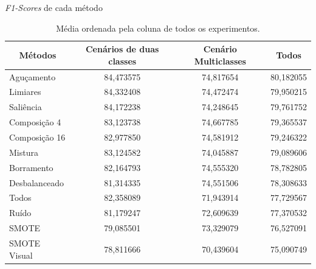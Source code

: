 \documentclass{beamer}
\begin{document}
\begin{frame}{\textit{F1-Scores} de cada método}
  \setlength\leftmargini{1em}
  \begin{table}
    \centering
    \caption{Média ordenada pela coluna de todos os experimentos.}
    \tiny{
    \begin{tabular}{|l|c|c|c|}
      \hline
      \multicolumn{1}{|c|}{\textbf{Métodos}} & \textbf{Cenários de duas classes} & \textbf{Cenário Multiclasses} & \textbf{Todos} \\ \hline
      Aguçamento                             & 84,473575                         & 74,817654                     & 80,182055      \\ \hline
      Limiares                               & 84,332408                         & 74,472474                     & 79,950215      \\ \hline
      Saliência                              & 84,172238                         & 74,248645                     & 79,761752      \\ \hline
      Composição 4                           & 83,123738                         & 74,667785                     & 79,365537      \\ \hline
      Composição 16                          & 82,977850                         & 74,581912                     & 79,246322      \\ \hline
      Mistura                                & 83,124582                         & 74,045887                     & 79,089606      \\ \hline
      Borramento                             & 82,164793                         & 74,555320                     & 78,782805      \\ \hline
      Desbalanceado                          & 81,314335                         & 74,551506                     & 78,308633      \\ \hline
      Todos                                  & 82,358089                         & 71,943914                     & 77,729567      \\ \hline
      Ruído                                  & 81,179247                         & 72,609639                     & 77,370532      \\ \hline
      SMOTE                                  & 79,085501                         & 73,329079                     & 76,527091      \\ \hline
      SMOTE Visual                           & 78,811666                         & 70,439604                     & 75,090749      \\ \hline
    \end{tabular}
    }
  \end{table}
\end{frame}
\end{document}
